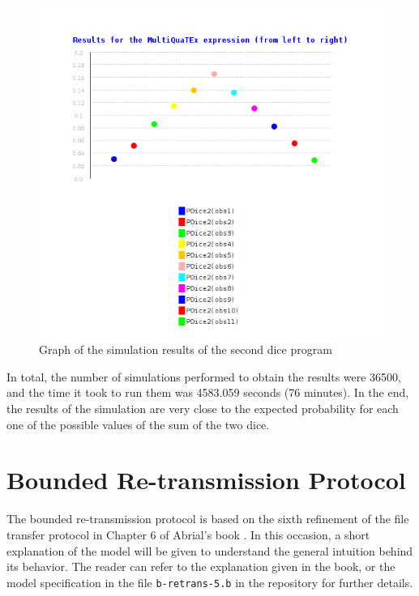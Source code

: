 \begin{figure}[H]
    \centering
    \includegraphics[scale = 0.5]{images/CS4.png}
    \caption{Graph of the simulation results of the second dice program}
    \label{fig:ce4}
\end{figure}
In total, the number of simulations performed to obtain the results were 36500, and the time it took to run them was 4583.059 seconds (76 minutes). In the end, the results of the simulation are very close to the expected probability for each one of the possible values of the sum of the two dice.

\section{Bounded Re-transmission Protocol}
The bounded re-transmission protocol is based on the sixth refinement of the file transfer protocol in Chapter 6 of Abrial's book \cite{Abrial2011}. In this occasion, a short explanation of the model will be given to understand the general intuition behind its behavior. The reader can refer to the explanation given in the book, or the model specification in the file \texttt{b-retrans-5.b} in the repository for further details. 

